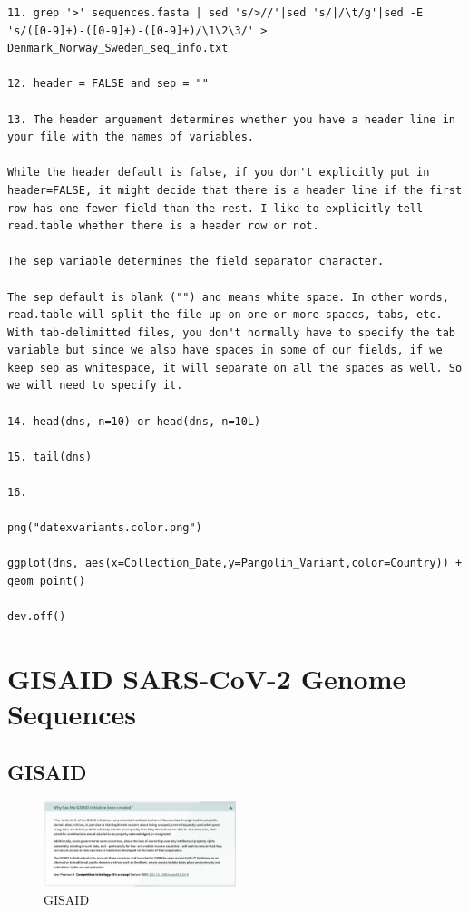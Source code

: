 \documentclass[
]{book}
\begin{document}
\begin{verbatim}
11. grep '>' sequences.fasta | sed 's/>//'|sed 's/|/\t/g'|sed -E 's/([0-9]+)-([0-9]+)-([0-9]+)/\1\2\3/' > Denmark_Norway_Sweden_seq_info.txt

12. header = FALSE and sep = ""

13. The header arguement determines whether you have a header line in your file with the names of variables.

While the header default is false, if you don't explicitly put in header=FALSE, it might decide that there is a header line if the first row has one fewer field than the rest. I like to explicitly tell read.table whether there is a header row or not.

The sep variable determines the field separator character.

The sep default is blank ("") and means white space. In other words, read.table will split the file up on one or more spaces, tabs, etc. With tab-delimitted files, you don't normally have to specify the tab variable but since we also have spaces in some of our fields, if we keep sep as whitespace, it will separate on all the spaces as well. So we will need to specify it.

14. head(dns, n=10) or head(dns, n=10L)

15. tail(dns)

16.

png("datexvariants.color.png")

ggplot(dns, aes(x=Collection_Date,y=Pangolin_Variant,color=Country)) + geom_point()

dev.off()
\end{verbatim}

\hypertarget{gisaid-sars-cov-2-genome-sequences}{%
\chapter{GISAID SARS-CoV-2 Genome Sequences}\label{gisaid-sars-cov-2-genome-sequences}}

\hypertarget{gisaid}{%
\section{GISAID}\label{gisaid}}

\begin{figure}
\centering
\includegraphics[width=0.5\textwidth,height=\textheight]{./Figures/gisaid.png}
\caption{GISAID}
\end{figure}
\end{document}
